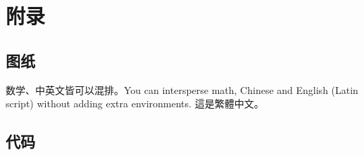 \appendix
\section{附录}
\songti

\subsection{图纸}

数学、中英文皆可以混排。You can intersperse math, Chinese and English (Latin script) without adding extra environments.
這是繁體中文。

\subsection{代码}